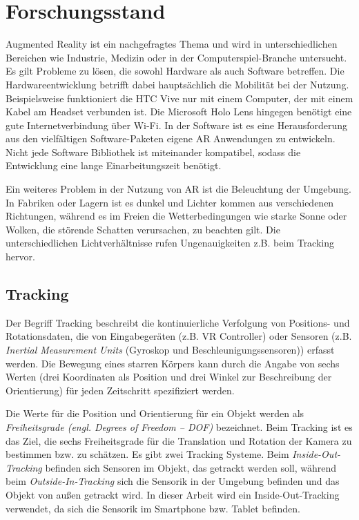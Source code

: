 \section{Forschungsstand}
Augmented Reality ist ein nachgefragtes Thema und wird in unterschiedlichen Bereichen wie Industrie, Medizin oder in der Computerspiel-Branche untersucht\cite{Sudirman}\cite{Santi}\cite{Huang}. Es gilt Probleme zu lösen, die sowohl Hardware als auch Software betreffen. Die Hardwareentwicklung betrifft dabei hauptsächlich die Mobilität bei der Nutzung. Beispielsweise funktioniert die HTC Vive nur mit einem Computer, der mit einem Kabel am Headset verbunden ist. Die Microsoft Holo Lens hingegen benötigt eine gute Internetverbindung über Wi-Fi. In der Software ist es eine Herausforderung aus den vielfältigen Software-Paketen eigene AR Anwendungen zu entwickeln. Nicht jede Software Bibliothek ist miteinander kompatibel, sodass die Entwicklung eine lange Einarbeitungszeit benötigt\cite*[Vgl.][]{Santi}.

Ein weiteres Problem in der Nutzung von AR ist die Beleuchtung der Umgebung. In Fabriken oder Lagern ist es dunkel und Lichter kommen aus verschiedenen Richtungen, während es im Freien die Wetterbedingungen wie starke Sonne oder Wolken, die störende Schatten verursachen, zu beachten gilt. Die unterschiedlichen Lichtverhältnisse rufen Ungenauigkeiten z.B. beim Tracking hervor.

\subsection{Tracking}
Der Begriff Tracking beschreibt die kontinuierliche Verfolgung von Positions- und Rotationsdaten, die von Eingabegeräten (z.B. VR Controller) oder Sensoren (z.B. \textit{Inertial Measurement Units} (Gyroskop und Beschleunigungssensoren)) erfasst werden. Die Bewegung eines starren Körpers kann \glqq durch die Angabe von sechs Werten (drei Koordinaten als Position und drei Winkel zur Beschreibung der Orientierung) für jeden Zeitschritt spezifiziert werden\grqq{}\cite*[Dörner (2019) S.119f.]{doerner}. 

Die Werte für die Position und Orientierung für ein Objekt werden als \textit{Freiheitsgrade (engl. Degrees of Freedom – DOF)} bezeichnet. Beim Tracking ist es das Ziel, die sechs Freiheitsgrade
für die Translation und Rotation der Kamera zu bestimmen bzw. zu schätzen\cite{doerner}. Es gibt zwei Tracking Systeme. Beim \textit{Inside-Out-Tracking} befinden sich Sensoren im Objekt, das getrackt werden soll, während beim \textit{Outside-In-Tracking} sich die Sensorik in der Umgebung befinden und das Objekt von außen getrackt wird. In dieser Arbeit wird ein Inside-Out-Tracking verwendet, da sich die Sensorik im Smartphone bzw. Tablet befinden.

